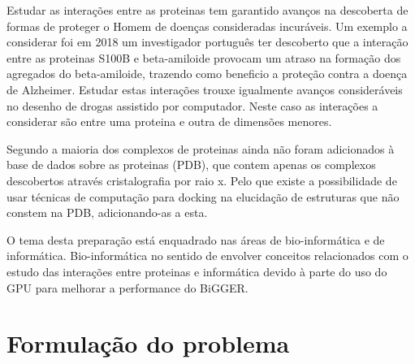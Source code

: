 Estudar as interações entre as proteinas tem garantido avanços na descoberta de formas de proteger o Homem de doenças consideradas incuráveis. Um exemplo a considerar foi em 2018 um investigador português ter descoberto que a interação entre as proteinas S100B e beta-amiloide provocam um atraso na formação dos agregados do beta-amiloide, trazendo como beneficio a proteção contra a doença de Alzheimer\cite{noticia}. Estudar estas interações trouxe igualmente avanços consideráveis no desenho de drogas assistido por computador. Neste caso as interações a considerar são entre uma proteina e outra de dimensões menores.\par
Segundo \cite{ZDOCKaccelerating} a maioria dos complexos de proteinas ainda não foram adicionados à base de dados sobre as proteinas (PDB), que contem apenas os complexos descobertos através cristalografia por raio x. Pelo que existe a possibilidade de usar técnicas de computação para docking na elucidação de estruturas que não constem na PDB, adicionando-as a esta.
\par
O tema desta preparação está enquadrado nas áreas de bio-informática e de informática. Bio-informática no sentido de envolver conceitos relacionados com o estudo das interações entre proteinas e informática devido à parte do uso do GPU para melhorar a performance do BiGGER.
\section{Formulação do problema}

